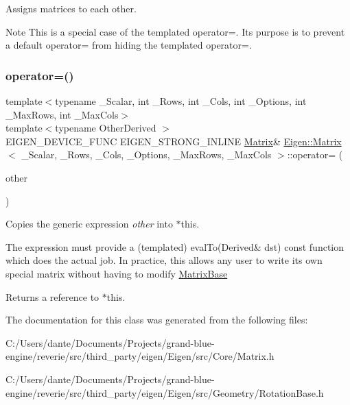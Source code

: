 Assigns matrices to each other. 

\begin{DoxyNote}{Note}
This is a special case of the templated operator=. Its purpose is to prevent a default operator= from hiding the templated operator=. 
\end{DoxyNote}
\mbox{\label{class_eigen_1_1_matrix_ae1be4ae99dbfc91c6a3a0d0af7165047}} 
\subsubsection{\texorpdfstring{operator=()}{operator=()}\hspace{0.1cm}{\footnotesize\ttfamily [3/3]}}
{\footnotesize\ttfamily template$<$typename \+\_\+\+Scalar, int \+\_\+\+Rows, int \+\_\+\+Cols, int \+\_\+\+Options, int \+\_\+\+Max\+Rows, int \+\_\+\+Max\+Cols$>$ \\
template$<$typename Other\+Derived $>$ \\
E\+I\+G\+E\+N\+\_\+\+D\+E\+V\+I\+C\+E\+\_\+\+F\+U\+NC E\+I\+G\+E\+N\+\_\+\+S\+T\+R\+O\+N\+G\+\_\+\+I\+N\+L\+I\+NE \mbox{\hyperlink{class_eigen_1_1_matrix}{Matrix}}\& \mbox{\hyperlink{class_eigen_1_1_matrix}{Eigen\+::\+Matrix}}$<$ \+\_\+\+Scalar, \+\_\+\+Rows, \+\_\+\+Cols, \+\_\+\+Options, \+\_\+\+Max\+Rows, \+\_\+\+Max\+Cols $>$\+::operator= (\begin{DoxyParamCaption}\item[{const \mbox{\hyperlink{struct_eigen_1_1_eigen_base}{Eigen\+Base}}$<$ Other\+Derived $>$ \&}]{other }\end{DoxyParamCaption})\hspace{0.3cm}{\ttfamily [inline]}}



Copies the generic expression {\itshape other} into $\ast$this. 

The expression must provide a (templated) eval\+To(\+Derived\& dst) const function which does the actual job. In practice, this allows any user to write its own special matrix without having to modify \mbox{\hyperlink{class_eigen_1_1_matrix_base}{Matrix\+Base}}

\begin{DoxyReturn}{Returns}
a reference to $\ast$this. 
\end{DoxyReturn}


The documentation for this class was generated from the following files\+:\begin{DoxyCompactItemize}
\item 
C\+:/\+Users/dante/\+Documents/\+Projects/grand-\/blue-\/engine/reverie/src/third\+\_\+party/eigen/\+Eigen/src/\+Core/Matrix.\+h\item 
C\+:/\+Users/dante/\+Documents/\+Projects/grand-\/blue-\/engine/reverie/src/third\+\_\+party/eigen/\+Eigen/src/\+Geometry/Rotation\+Base.\+h\end{DoxyCompactItemize}
